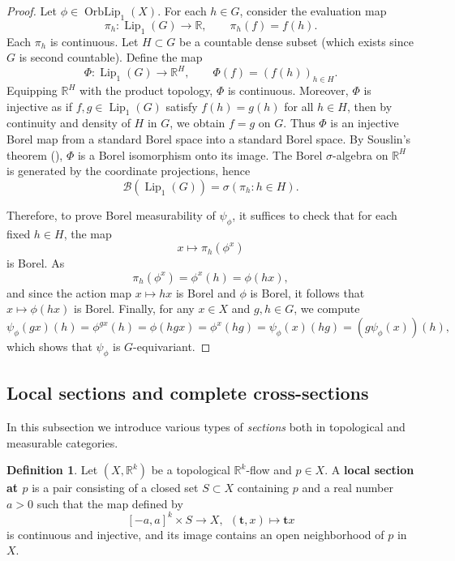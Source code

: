 \documentclass[11pt]{article}
\theoremstyle{plain}
\theoremstyle{definition}
\newtheorem{defn}[thm]{Definition}
\DeclareMathOperator{\Lip}{Lip}
\DeclareMathOperator{\OrbLip}{OrbLip}
\def\tt{\mathbf t}
\numberwithin{figure}{section}
\begin{document}
\begin{proof}
Let $\phi\in \OrbLip_{1}(X)$. For each $h\in G$, consider the evaluation map
\[
\pi_h:\Lip_1(G)\to \mathbb{R}, \qquad \pi_h(f)=f(h).
\]
Each $\pi_h$ is continuous. Let $H\subset G$ be a countable dense subset (which exists since $G$ is second countable).
Define the map
\[
\Phi:\Lip_1(G)\to \mathbb{R}^H, \qquad \Phi(f) = (f(h))_{h\in H}.
\]
Equipping $\mathbb{R}^H$ with the product topology, $\Phi$ is continuous. Moreover,  $\Phi$ is injective as if $f,g\in \Lip_1(G)$ satisfy $f(h)=g(h)$ for all $h\in H$, then by continuity and density of $H$ in $G$, we obtain $f=g$ on $G$. Thus $\Phi$ is an injective Borel map from a standard Borel space into a  standard Borel space. By Souslin's theorem (\cite[Theorem 2.8(2)]{G03}), $\Phi$ is a Borel isomorphism onto its image. The Borel $\sigma$-algebra on $\mathbb{R}^H$ is generated by the coordinate projections, hence
\[
\mathcal{B}(\Lip_1(G)) = \sigma(\pi_h : h\in H).
\]

Therefore, to prove Borel measurability of $\psi_\phi$, it suffices to check that for each fixed $h\in H$, the map
\[
x \mapsto \pi_h(\phi^x)
\]
is Borel. As
\[
\pi_h(\phi^x) = \phi^x(h) = \phi(hx),
\]
and since the action map $x\mapsto hx$ is Borel and $\phi$ is Borel, it follows that $x\mapsto \phi(hx)$ is Borel.
Finally, for any $x\in X$ and $g,h\in G$, we compute
\[
\psi_\phi(gx)(h)
= \phi^{gx}(h)
= \phi(hgx)
= \phi^x(hg)
= \psi_\phi(x)(hg)
= (g\psi_\phi(x))(h),
\]
which shows that $\psi_\phi$ is $G$-equivariant.
\end{proof}


\subsection{Local sections and complete cross-sections}

In this subsection we introduce various types of \textit{sections} both in topological and measurable categories. 

\begin{defn}\label{def:local section}
    Let $(X,\mathbb{R}^k)$ be a topological $\mathbb{R}^k$-flow and $p\in X$. A \textbf{local section at $p$} is a pair consisting of a  closed set $S\subset X$ containing $p$ and a real number $a>0$  such that the map defined by
    \begin{equation}\label{section}
        [-a,a]^k\times S\to X,~~(\tt,x)\mapsto \mathbf t x
    \end{equation}
    is continuous and injective, and its image contains an open neighborhood of $p$ in $X$. 
\end{defn}
\end{document}

